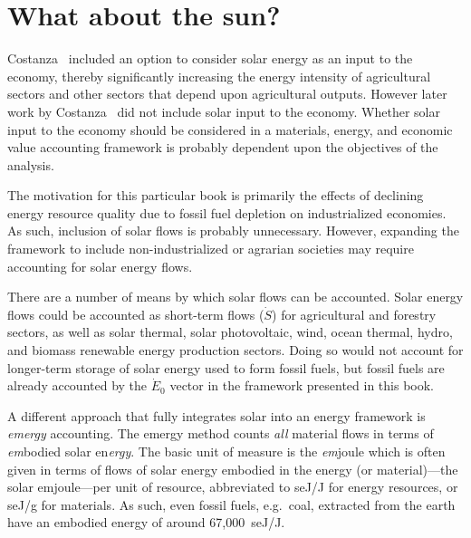 \section{What about the sun?}
\label{sec:emergy}

Costanza~\cite{Costanza:1978vd} included an option to consider 
solar energy as an input to the economy, 
thereby significantly increasing the energy intensity 
of agricultural sectors and other sectors 
that depend upon agricultural outputs. 
However later work by Costanza~\cite{Costanza:1984tq,Costanza:1980ww} 
did not include solar input to the economy.
Whether solar input to the economy 
should be considered in a materials, energy, and economic value 
accounting framework is probably dependent upon 
the objectives of the analysis. 

The motivation for this particular book is primarily 
the effects of declining energy resource quality
due to fossil fuel depletion on industrialized economies. 
As such, inclusion of solar flows is probably unnecessary. 
However, expanding the framework to include non-industrialized 
or agrarian societies may require accounting for solar energy flows. 

There are a number of means by which solar flows can be accounted. 
Solar energy flows could be accounted as short-term flows ($\dot{S}$)
for agricultural and forestry sectors, 
as well as 
solar thermal, 
solar photovoltaic, 
wind, 
ocean thermal, 
hydro, and
biomass
renewable energy
production sectors.
Doing so would not account for longer-term storage
of solar energy used to form fossil fuels, 
but fossil fuels are already accounted by the $\dot{E}_{0}$ vector
in the framework presented in this book.

A different approach that fully integrates solar 
into an energy framework is \emph{emergy} accounting.
The emergy method counts \emph{all} material flows 
in terms of \emph{em}bodied solar en\emph{ergy}.\cite{Odum1975, Odum1996}
The basic unit of measure is 
the \emph{em}joule which is often given in terms 
of flows of solar energy embodied in 
the energy (or material)---the solar emjoule---per unit of resource, 
abbreviated to seJ/J for energy resources, 
or seJ/g for materials. 
As such, even fossil fuels, e.g.\ coal, 
extracted from the earth have an embodied energy 
of around 67,000~seJ/J.\cite{Brown2004} 


